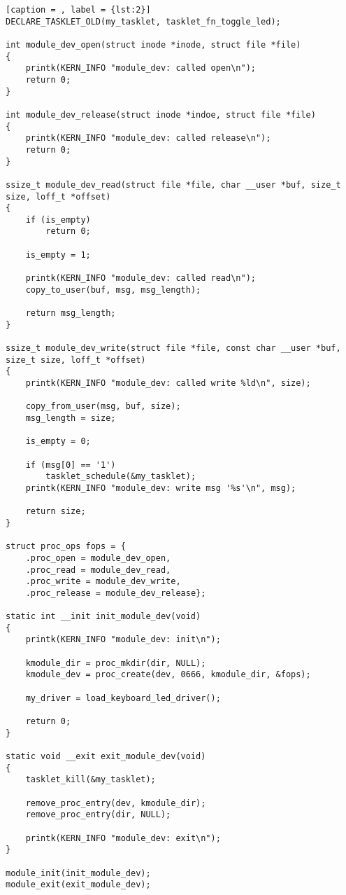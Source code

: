 \begin{lstlisting}[caption = , label = {lst:2}]
DECLARE_TASKLET_OLD(my_tasklet, tasklet_fn_toggle_led);

int module_dev_open(struct inode *inode, struct file *file)
{
    printk(KERN_INFO "module_dev: called open\n");
    return 0;
}

int module_dev_release(struct inode *indoe, struct file *file)
{
    printk(KERN_INFO "module_dev: called release\n");
    return 0;
}

ssize_t module_dev_read(struct file *file, char __user *buf, size_t size, loff_t *offset)
{
    if (is_empty)
        return 0;

    is_empty = 1;

    printk(KERN_INFO "module_dev: called read\n");
    copy_to_user(buf, msg, msg_length);

    return msg_length;
}

ssize_t module_dev_write(struct file *file, const char __user *buf, size_t size, loff_t *offset)
{
    printk(KERN_INFO "module_dev: called write %ld\n", size);

    copy_from_user(msg, buf, size);
    msg_length = size;

    is_empty = 0;

    if (msg[0] == '1')
        tasklet_schedule(&my_tasklet);
    printk(KERN_INFO "module_dev: write msg '%s'\n", msg);

    return size;
}

struct proc_ops fops = {
    .proc_open = module_dev_open,
    .proc_read = module_dev_read,
    .proc_write = module_dev_write,
    .proc_release = module_dev_release};

static int __init init_module_dev(void)
{
    printk(KERN_INFO "module_dev: init\n");

    kmodule_dir = proc_mkdir(dir, NULL);
    kmodule_dev = proc_create(dev, 0666, kmodule_dir, &fops);

    my_driver = load_keyboard_led_driver();

    return 0;
}

static void __exit exit_module_dev(void)
{
    tasklet_kill(&my_tasklet);

    remove_proc_entry(dev, kmodule_dir);
    remove_proc_entry(dir, NULL);

    printk(KERN_INFO "module_dev: exit\n");
}

module_init(init_module_dev);
module_exit(exit_module_dev);
\end{lstlisting}
